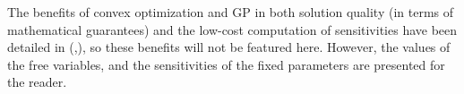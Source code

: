 The benefits of convex optimization and \gls{GP} in both solution
quality (in terms of mathematical guarantees) and the low-cost
computation of sensitivities have been detailed in (\cite{gp_ac_design},\cite{sp_ac_design}),
so these benefits will not be featured here. However, the values of the free variables,
and the sensitivities of the fixed parameters are presented for the reader.

\begin{center}

    \label{t:SimPleAC_results}
\end{center}

\begin{center}

    \label{t:SimPleAC_sens}
\end{center}



